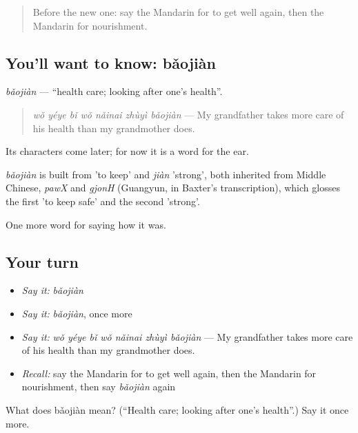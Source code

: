 \label{lesson:ZH-C483-baojian}



\begin{quote}
Before the new one: say the Mandarin for to get well again, then the Mandarin for nourishment.
\end{quote}

\subsection*{You'll want to know: bǎojiàn}
\emph{bǎojiàn} — \textquotedblleft{}health care; looking after one's health\textquotedblright{}.

\begin{quote}
\emph{wǒ yéye bǐ wǒ nǎinai zhùyì bǎojiàn} — My grandfather takes more care of his health than my grandmother does.
\end{quote}

Its characters come later; for now it is a word for the ear.

\begin{cousinweb}
\emph{bǎojiàn} is built from  'to keep' and \emph{jiàn} 'strong', both inherited from Middle Chinese, \emph{pawX} and \emph{gjonH} (Guangyun, in Baxter's transcription), which glosses the first 'to keep safe' and the second 'strong'.
\end{cousinweb}

\begin{grammarlens}[title={What you've built}]
One more word for saying how it was.
\end{grammarlens}

\subsection*{Your turn}
\begin{itemize}
\raggedright
  \item \emph{Say it:} \emph{bǎojiàn}
  \item \emph{Say it:} \emph{bǎojiàn}, once more
  \item \emph{Say it:} \emph{wǒ yéye bǐ wǒ nǎinai zhùyì bǎojiàn} — My grandfather takes more care of his health than my grandmother does.
  \item \emph{Recall:} say the Mandarin for to get well again, then the Mandarin for nourishment, then say \emph{bǎojiàn} again
\end{itemize}

\begin{tcolorbox}[breakable,colback=teal!4,colframe=teal!35!black,title={Before you move on}]
What does bǎojiàn mean? (\textquotedblleft{}Health care; looking after one's health\textquotedblright{}.) Say it once more.
\end{tcolorbox}
